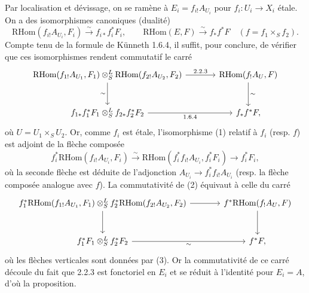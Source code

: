 \documentclass[11pt]{article}
\providecommand{\RHom}{\mathrm{RHom}}
\providecommand{\RHom}{\mathrm{RHom}}
\providecommand{\RHom}{\mathrm R\mathcal{H}om}
\providecommand{\RHom}{\mathrm{RHom}}
\begin{document}
Par localisation et dévissage, on se ramène à $E_i=f_{i!}A_{U_i}$ pour $f_i:U_i\to X_i$ étale. On a des isomorphismes canoniques (dualité)
\begin{equation}\tag{1}
\RHom(f_{i!}A_{U_i},F_i)\xrightarrow{\sim}f_{i*}f_i^{*}F_i,
\qquad
\RHom(E,F)\xrightarrow{\sim}f_{*}f^{*}F\quad(f=f_1\times_S f_2).
\end{equation}
Compte tenu de la formule de Künneth 1.6.4, il suffit, pour conclure, de vérifier que ces isomorphismes rendent commutatif le carré
\[
\begin{tikzcd}[column sep=large,row sep=large]
\RHom(f_{1!}A_{U_1},F_1)\otimes^{L}_{S}\RHom(f_{2!}A_{U_2},F_2) \arrow[r,"2.2.3"] \arrow[d,"\sim"'] & \RHom(f_{!}A_U,F) \arrow[d,"\sim"]\\
f_{1*}f_1^{*}F_1\otimes^{L}_{S}f_{2*}f_2^{*}F_2 \arrow[r,"1.6.4"'] & f_{*}f^{*}F,
\end{tikzcd}
\]
où $U=U_1\times_S U_2$. Or, comme $f_i$ est étale, l'isomorphisme (1) relatif à $f_i$ (resp. $f$) est adjoint de la flèche composée
\begin{equation}\tag{3}
f_i^{*}\RHom(f_{i!}A_{U_i},F_i)\xrightarrow{\sim}\RHom(f_i^{*}f_{i!}A_{U_i},f_i^{*}F_i)\longrightarrow f_i^{*}F_i,
\end{equation}
où la seconde flèche est déduite de l'adjonction $A_{U_i}\to f_i^{*}f_{i!}A_{U_i}$ (resp. la flèche composée analogue avec $f$). La commutativité de (2) équivaut à celle du carré
\[
\begin{tikzcd}[column sep=large,row sep=large]
f_1^{*}\RHom(f_{1!}A_{U_1},F_1)\otimes^{L}_{S}f_2^{*}\RHom(f_{2!}A_{U_2},F_2) \arrow[r] \arrow[d] & f^{*}\RHom(f_{!}A_U,F) \arrow[d]\\
f_1^{*}F_1\otimes^{L}_{S}f_2^{*}F_2 \arrow[r,"\sim"'] & f^{*}F,
\end{tikzcd}
\]
où les flèches verticales sont données par (3). Or la commutativité de ce carré découle du fait que 2.2.3 est fonctoriel en $E_i$ et se réduit à l'identité pour $E_i=A$, d'où la proposition.
\end{document}
